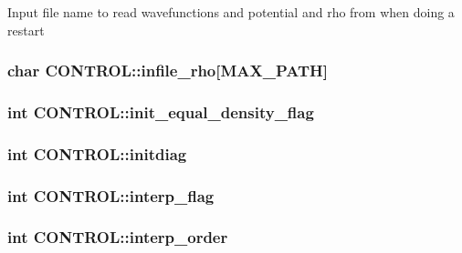 Input file name to read wavefunctions and potential and rho from when doing a restart \hypertarget{struct_c_o_n_t_r_o_l_a9563b9953519b63bbace59b1a642ac68}{
\subsubsection[{infile\-\_\-rho}]{\setlength{\rightskip}{0pt plus 5cm}char C\-O\-N\-T\-R\-O\-L\-::infile\-\_\-rho\mbox{[}{\bf M\-A\-X\-\_\-\-P\-A\-T\-H}\mbox{]}}}\label{struct_c_o_n_t_r_o_l_a9563b9953519b63bbace59b1a642ac68}
\hypertarget{struct_c_o_n_t_r_o_l_ac9f884c0b7ef1f987681625ba063fc91}{
\subsubsection[{init\-\_\-equal\-\_\-density\-\_\-flag}]{\setlength{\rightskip}{0pt plus 5cm}int C\-O\-N\-T\-R\-O\-L\-::init\-\_\-equal\-\_\-density\-\_\-flag}}\label{struct_c_o_n_t_r_o_l_ac9f884c0b7ef1f987681625ba063fc91}
\hypertarget{struct_c_o_n_t_r_o_l_a21ed7a502a7347e3ed540c758e5da3a2}{
\subsubsection[{initdiag}]{\setlength{\rightskip}{0pt plus 5cm}int C\-O\-N\-T\-R\-O\-L\-::initdiag}}\label{struct_c_o_n_t_r_o_l_a21ed7a502a7347e3ed540c758e5da3a2}
\hypertarget{struct_c_o_n_t_r_o_l_a93912808ed2e5e8ce898c5ae30b3c468}{
\subsubsection[{interp\-\_\-flag}]{\setlength{\rightskip}{0pt plus 5cm}int C\-O\-N\-T\-R\-O\-L\-::interp\-\_\-flag}}\label{struct_c_o_n_t_r_o_l_a93912808ed2e5e8ce898c5ae30b3c468}
\hypertarget{struct_c_o_n_t_r_o_l_a6b425ece178cc188732d8e0e423200c3}{
\subsubsection[{interp\-\_\-order}]{\setlength{\rightskip}{0pt plus 5cm}int C\-O\-N\-T\-R\-O\-L\-::interp\-\_\-order}}\label{struct_c_o_n_t_r_o_l_a6b425ece178cc188732d8e0e423200c3}
